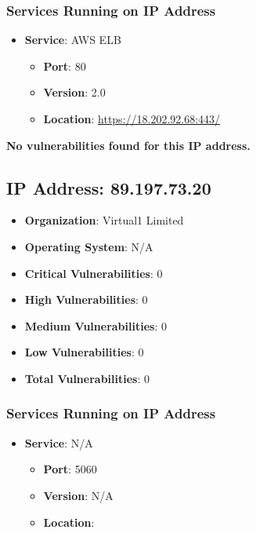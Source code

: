 \documentclass{article}
\begin{document}
\subsubsection*{Services Running on IP Address}

\begin{itemize}
    
        \item \textbf{Service}: AWS ELB
        \begin{itemize}
            \item \textbf{Port}: 80
            \item \textbf{Version}:  2.0 
            \item \textbf{Location}: \href{ https://18.202.92.68:443/ }{ https://18.202.92.68:443/ }
        \end{itemize}
    
\end{itemize}


\textbf{No vulnerabilities found for this IP address.}




\clearpage



\subsection*{IP Address: 89.197.73.20}

\begin{itemize}
    \item \textbf{Organization}: Virtual1 Limited
    \item \textbf{Operating System}:  N/A 
    \item \textbf{Critical Vulnerabilities}: 0
    \item \textbf{High Vulnerabilities}: 0
    \item \textbf{Medium Vulnerabilities}: 0
    \item \textbf{Low Vulnerabilities}: 0
    \item \textbf{Total Vulnerabilities}: 0
\end{itemize}

\subsubsection*{Services Running on IP Address}

\begin{itemize}
    
        \item \textbf{Service}: N/A
        \begin{itemize}
            \item \textbf{Port}: 5060
            \item \textbf{Version}:  N/A 
            \item \textbf{Location}: \href{  }{  }
        \end{itemize}
    
\end{itemize}
\end{document}
